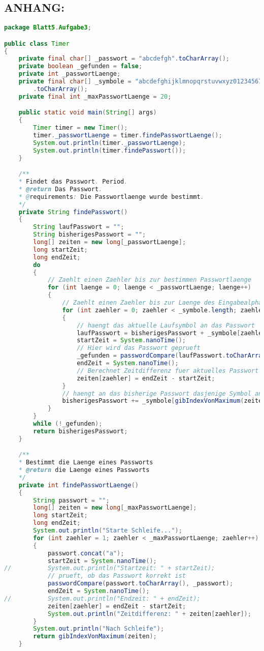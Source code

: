 \documentclass{article}
\begin{document}
\subsection*{ANHANG:}
\begin{lstlisting}[language=Java]
package Blatt5.Aufgabe3;

public class Timer
{
	private final char[] _passwort = "abcdefgh".toCharArray();
	private boolean _gefunden = false;
	private int _passwortLaenge;
	private final char[] _symbole = "abcdefghijklmnopqrstuvwxyz0123456789"
    	.toCharArray();
	private final int _maxPasswortLaenge = 20;

	public static void main(String[] args)
	{
    	Timer timer = new Timer();
    	timer._passwortLaenge = timer.findePasswortLaenge();
    	System.out.println(timer._passwortLaenge);
    	System.out.println(timer.findePasswort());
	}

	/**
 	* Findet das Passwort. Period.
 	* @return Das Passwort.
 	* @requirements: Die Passwortlaenge wurde bestimmt.
 	*/
	private String findePasswort()
	{
    	String laufPasswort = "";
    	String bisherigesPasswort = "";
    	long[] zeiten = new long[_passwortLaenge];
    	long startZeit;
    	long endZeit;
    	do
    	{
        	// Zaehlt einen Zaehler bis zur bestimmen Passwortlaenge
        	for (int laenge = 0; laenge < _passwortLaenge; laenge++)
        	{
            	// Zaehlt einen Zaehler bis zur Laenge des Eingabealphabets
            	for (int zaehler = 0; zaehler < _symbole.length; zaehler++)
            	{
                	// haengt das aktuelle Laufsymbol an das Passwort
                	laufPasswort = bisherigesPasswort + _symbole[zaehler];
                	startZeit = System.nanoTime();
                	// Hier wird das Passwort geprueft
                	_gefunden = passwordCompare(laufPasswort.toCharArray(), _passwort);
                	endZeit = System.nanoTime();
                	// Berechnet Zeitdifferenz fuer aktuelles Passwort
                	zeiten[zaehler] = endZeit - startZeit;
            	}
            	// haengt an das bisherige Passwort dasjenige Symbol an, fuer welches die groesste Zeit gebraucht wurde
            	bisherigesPasswort += _symbole[gibIndexVonMaximum(zeiten)];
        	}
    	}
    	while (!_gefunden);
    	return bisherigesPasswort;
	}

	/**
 	* Bestimmt die Laenge eines Passworts
 	* @return die Laenge eines Passworts
 	*/
	private int findePasswortLaenge()
	{
    	String passwort = "";
    	long[] zeiten = new long[_maxPasswortLaenge];
    	long startZeit;
    	long endZeit;
    	System.out.println("Starte Schleife...");
    	for (int zaehler = 1; zaehler < _maxPasswortLaenge; zaehler++)
    	{
        	passwort.concat("a");
        	startZeit = System.nanoTime();
//        	System.out.println("Startzeit: " + startZeit);
        	// prueft, ob das Passwort korrekt ist
        	passwordCompare(passwort.toCharArray(), _passwort);
        	endZeit = System.nanoTime();
//        	System.out.println("Endzeit: " + endZeit);
        	zeiten[zaehler] = endZeit - startZeit;
        	System.out.println("Zeitdifferenz: " + zeiten[zaehler]);
    	}
    	System.out.println("Nach Schleife");
    	return gibIndexVonMaximum(zeiten);
	}


\end{lstlisting}
\end{document}
